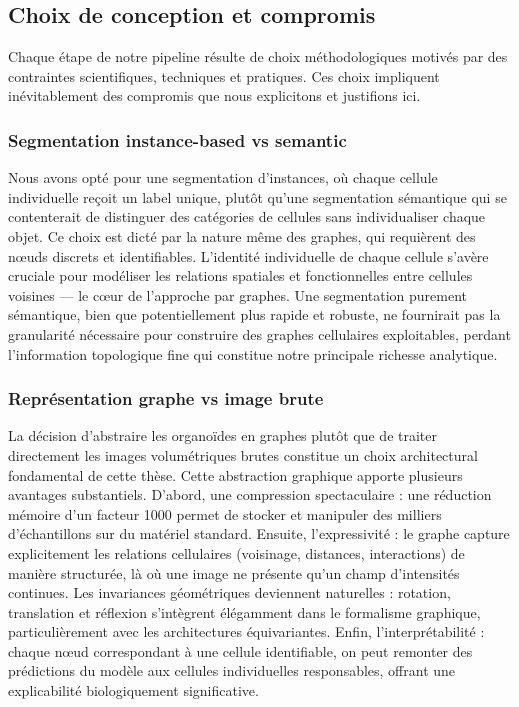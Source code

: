 \subsection{Choix de conception et compromis}

Chaque étape de notre pipeline résulte de choix méthodologiques motivés par des contraintes scientifiques, techniques et pratiques. Ces choix impliquent inévitablement des compromis que nous explicitons et justifions ici.

\subsubsection{Segmentation instance-based vs semantic}

Nous avons opté pour une segmentation d'instances, où chaque cellule individuelle reçoit un label unique, plutôt qu'une segmentation sémantique qui se contenterait de distinguer des catégories de cellules sans individualiser chaque objet. Ce choix est dicté par la nature même des graphes, qui requièrent des nœuds discrets et identifiables. L'identité individuelle de chaque cellule s'avère cruciale pour modéliser les relations spatiales et fonctionnelles entre cellules voisines — le cœur de l'approche par graphes. Une segmentation purement sémantique, bien que potentiellement plus rapide et robuste, ne fournirait pas la granularité nécessaire pour construire des graphes cellulaires exploitables, perdant l'information topologique fine qui constitue notre principale richesse analytique.

\subsubsection{Représentation graphe vs image brute}

La décision d'abstraire les organoïdes en graphes plutôt que de traiter directement les images volumétriques brutes constitue un choix architectural fondamental de cette thèse. Cette abstraction graphique apporte plusieurs avantages substantiels. D'abord, une compression spectaculaire : une réduction mémoire d'un facteur 1000 permet de stocker et manipuler des milliers d'échantillons sur du matériel standard. Ensuite, l'expressivité : le graphe capture explicitement les relations cellulaires (voisinage, distances, interactions) de manière structurée, là où une image ne présente qu'un champ d'intensités continues. Les invariances géométriques deviennent naturelles : rotation, translation et réflexion s'intègrent élégamment dans le formalisme graphique, particulièrement avec les architectures équivariantes. Enfin, l'interprétabilité : chaque nœud correspondant à une cellule identifiable, on peut remonter des prédictions du modèle aux cellules individuelles responsables, offrant une explicabilité biologiquement significative.

